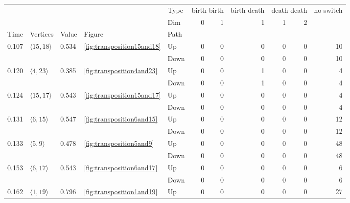 \documentclass{article}
\begin{document}
\begin{center}
\begin{tabular}{lllllrrrrrr}
\toprule
 &  &  &  & Type & \multicolumn{2}{r}{birth-birth} & birth-death & \multicolumn{2}{r}{death-death} & no switch \\
 &  &  &  & Dim & 0 & 1 & 1 & 1 & 2 &  \\
Time & Vertices & Value & Figure & Path &  &  &  &  &  &  \\
\midrule
\multirow[t]{2}{*}{0.107} & \multirow[t]{2}{*}{$\langle15, 18\rangle$} & \multirow[t]{2}{*}{0.534} & \multirow[t]{2}{*}{\ref{fig:transposition15and18}} & Up & 0 & 0 & 0 & 0 & 0 & 10 \\
 &  &  &  & Down & 0 & 0 & 0 & 0 & 0 & 10 \\
\cline{1-11} \cline{2-11} \cline{3-11} \cline{4-11}
\multirow[t]{2}{*}{0.120} & \multirow[t]{2}{*}{$\langle4, 23\rangle$} & \multirow[t]{2}{*}{0.385} & \multirow[t]{2}{*}{\ref{fig:transposition4and23}} & Up & 0 & 0 & 1 & 0 & 0 & 4 \\
 &  &  &  & Down & 0 & 0 & 1 & 0 & 0 & 4 \\
\cline{1-11} \cline{2-11} \cline{3-11} \cline{4-11}
\multirow[t]{2}{*}{0.124} & \multirow[t]{2}{*}{$\langle15, 17\rangle$} & \multirow[t]{2}{*}{0.543} & \multirow[t]{2}{*}{\ref{fig:transposition15and17}} & Up & 0 & 0 & 0 & 0 & 0 & 4 \\
 &  &  &  & Down & 0 & 0 & 0 & 0 & 0 & 4 \\
\cline{1-11} \cline{2-11} \cline{3-11} \cline{4-11}
\multirow[t]{2}{*}{0.131} & \multirow[t]{2}{*}{$\langle6, 15\rangle$} & \multirow[t]{2}{*}{0.547} & \multirow[t]{2}{*}{\ref{fig:transposition6and15}} & Up & 0 & 0 & 0 & 0 & 0 & 12 \\
 &  &  &  & Down & 0 & 0 & 0 & 0 & 0 & 12 \\
\cline{1-11} \cline{2-11} \cline{3-11} \cline{4-11}
\multirow[t]{2}{*}{0.133} & \multirow[t]{2}{*}{$\langle5, 9\rangle$} & \multirow[t]{2}{*}{0.478} & \multirow[t]{2}{*}{\ref{fig:transposition5and9}} & Up & 0 & 0 & 0 & 0 & 0 & 48 \\
 &  &  &  & Down & 0 & 0 & 0 & 0 & 0 & 48 \\
\cline{1-11} \cline{2-11} \cline{3-11} \cline{4-11}
\multirow[t]{2}{*}{0.153} & \multirow[t]{2}{*}{$\langle6, 17\rangle$} & \multirow[t]{2}{*}{0.543} & \multirow[t]{2}{*}{\ref{fig:transposition6and17}} & Up & 0 & 0 & 0 & 0 & 0 & 6 \\
 &  &  &  & Down & 0 & 0 & 0 & 0 & 0 & 6 \\
\cline{1-11} \cline{2-11} \cline{3-11} \cline{4-11}
\multirow[t]{2}{*}{0.162} & \multirow[t]{2}{*}{$\langle1, 19\rangle$} & \multirow[t]{2}{*}{0.796} & \multirow[t]{2}{*}{\ref{fig:transposition1and19}} & Up & 0 & 0 & 0 & 0 & 0 & 27 \\

\end{tabular}
\end{center}
\end{document}
